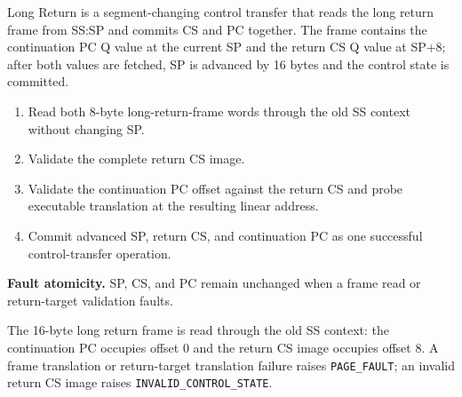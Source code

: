 Long Return is a segment-changing control transfer that reads the long return frame from SS:SP and commits CS and PC together. The frame contains the continuation PC Q value at the current SP and the return CS Q value at SP+8; after both values are fetched, SP is advanced by 16 bytes and the control state is committed.

\begin{enumerate}
\item Read both 8-byte long-return-frame words through the old SS context without changing SP.
\item Validate the complete return CS image.
\item Validate the continuation PC offset against the return CS and probe executable translation at the resulting linear address.
\item Commit advanced SP, return CS, and continuation PC as one successful control-transfer operation.
\end{enumerate}

\textbf{Fault atomicity.} SP, CS, and PC remain unchanged when a frame read or return-target validation faults.

The 16-byte long return frame is read through the old SS context: the continuation PC occupies offset 0 and the return CS
image occupies offset 8. A frame translation or return-target translation failure raises \texttt{PAGE\_FAULT}; an
invalid return CS image raises \texttt{INVALID\_CONTROL\_STATE}.

